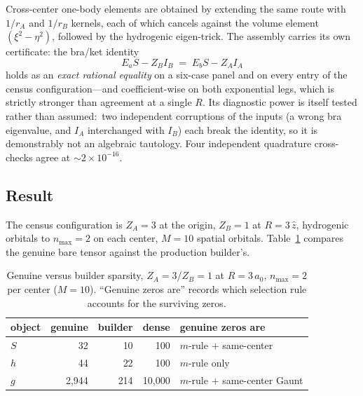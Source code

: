 \documentclass[aps,pra,twocolumn,superscriptaddress,longbibliography]{revtex4-2}
\begin{document}
Cross-center one-body elements are obtained by extending the same route
with $1/r_A$ and $1/r_B$ kernels, each of which cancels against the
volume element $(\xi^2 - \eta^2)$, followed by the hydrogenic eigen-trick.
The assembly carries its own certificate: the bra/ket identity
\begin{equation}
E_a S - Z_B I_B \;=\; E_b S - Z_A I_A
\label{eq:braket_certificate}
\end{equation}
holds as an \emph{exact rational equality} on a six-case panel and on every
entry of the census configuration---and coefficient-wise on both
exponential legs, which is strictly stronger than agreement at a single
$R$.  Its diagnostic power is itself tested rather than assumed:\ two
independent corruptions of the inputs (a wrong bra eigenvalue, and $I_A$
interchanged with $I_B$) each break the identity, so it is demonstrably not
an algebraic tautology.  Four independent
quadrature cross-checks agree at $\sim 2 \times 10^{-16}$.

\subsection{Result}

The census configuration is $Z_A = 3$ at the origin, $Z_B = 1$ at
$R = 3\,\hat{z}$, hydrogenic orbitals to $n_{\max} = 2$ on each center,
$M = 10$ spatial orbitals.  Table~\ref{tab:census} compares the genuine
bare tensor against the production builder's.

\begin{table}[b]
\caption{Genuine versus builder sparsity, $Z_A=3$/$Z_B=1$ at
$R = 3\,a_0$, $n_{\max} = 2$ per center ($M = 10$).  ``Genuine zeros
are'' records which selection rule accounts for the surviving zeros.}
\label{tab:census}
\begin{ruledtabular}
\begin{tabular}{lrrrl}
object & genuine & builder & dense & genuine zeros are \\
\hline
$S$ & 32 & 10 & 100 & $m$-rule $+$ same-center \\
$h$ & 44 & 22 & 100 & $m$-rule only \\
$g$ & 2{,}944 & 214 & 10{,}000 & $m$-rule $+$ same-center Gaunt \\
\end{tabular}
\end{ruledtabular}
\end{table}
\end{document}
